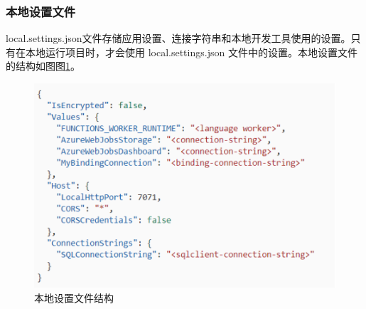 \documentclass[11pt]{article}
\begin{document}
\subsubsection{本地设置文件}
local.settings.json文件存储应用设置、连接字符串和本地开发工具使用的设置。只有在本地运行项目时，才会使用 local.settings.json 文件中的设置。本地设置文件的结构如图图\ref{fig4}。

\begin{figure}[h]	
	\centering
	\includegraphics[scale=0.6]{figs/4.png}        %
	\caption{本地设置文件结构}
	\label{fig4}	
\end{figure}
\end{document}
